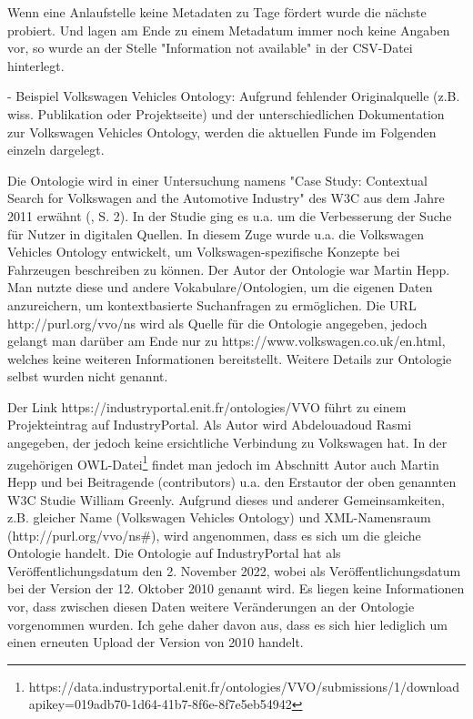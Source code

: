 \documentclass{article}
\begin{document}
Wenn eine Anlaufstelle keine Metadaten zu Tage fördert wurde die nächste probiert.
Und lagen am Ende zu einem Metadatum immer noch keine Angaben vor, so wurde an der Stelle "Information not available" in der CSV-Datei hinterlegt.

%

  - Beispiel Volkswagen Vehicles Ontology: Aufgrund fehlender Originalquelle (z.B. wiss. Publikation oder Projektseite) und der unterschiedlichen Dokumentation zur Volkswagen Vehicles Ontology, werden die aktuellen Funde im Folgenden einzeln dargelegt.

Die Ontologie wird in einer Untersuchung namens "Case Study: Contextual Search for Volkswagen and the Automotive Industry" des W3C aus dem Jahre 2011 erwähnt (\cite{greenly2011case}, S. 2).
In der Studie ging es u.a. um die Verbesserung der Suche für Nutzer in digitalen Quellen.
In diesem Zuge wurde u.a. die Volkswagen Vehicles Ontology entwickelt, um Volkswagen-spezifische Konzepte bei Fahrzeugen beschreiben zu können.
Der Autor der Ontologie war Martin Hepp.
Man nutzte diese und andere Vokabulare/Ontologien, um die eigenen Daten anzureichern, um kontextbasierte Suchanfragen zu ermöglichen.
Die URL http://purl.org/vvo/ns wird als Quelle für die Ontologie angegeben, jedoch gelangt man darüber am Ende nur zu https://www.volkswagen.co.uk/en.html, welches keine weiteren Informationen bereitstellt.
Weitere Details zur Ontologie selbst wurden nicht genannt.

Der Link https://industryportal.enit.fr/ontologies/VVO führt zu einem Projekteintrag auf IndustryPortal.
Als Autor wird Abdelouadoud Rasmi angegeben, der jedoch keine ersichtliche Verbindung zu Volkswagen hat.
In der zugehörigen OWL-Datei\footnote{https://data.industryportal.enit.fr/ontologies/VVO/submissions/1/downloadapikey=019adb70-1d64-41b7-8f6e-8f7e5eb54942} findet man jedoch im Abschnitt Autor auch Martin Hepp und bei Beitragende (contributors) u.a. den Erstautor der oben genannten W3C Studie William Greenly.
Aufgrund dieses und anderer Gemeinsamkeiten, z.B. gleicher Name (Volkswagen Vehicles Ontology) und XML-Namensraum (http://purl.org/vvo/ns\#), wird angenommen, dass es sich um die gleiche Ontologie handelt. Die Ontologie auf IndustryPortal hat als Veröffentlichungsdatum den 2. November 2022, wobei als Veröffentlichungsdatum bei der Version der 12. Oktober 2010 genannt wird.
Es liegen keine Informationen vor, dass zwischen diesen Daten weitere Veränderungen an der Ontologie vorgenommen wurden.
Ich gehe daher davon aus, dass es sich hier lediglich um einen erneuten Upload der Version von 2010 handelt.
\end{document}
